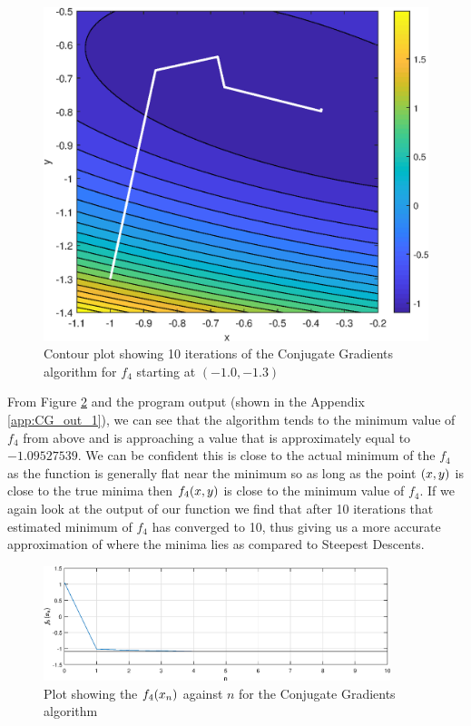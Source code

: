 \documentclass[11pt]{article} %
\let\originalleft\left
\let\originalright\right
\renewcommand{\left}{\mathopen{}\mathclose\bgroup\originalleft}
\renewcommand{\right}{\aftergroup\egroup\originalright}
\begin{document}
\begin{figure}[!h]
	\centering
	\includegraphics{"../Matlab Files/contour5"}
	\caption{Contour plot showing 10 iterations of the Conjugate Gradients algorithm for $f_4$ starting at $(-1.0, -1.3)$}
	\label{fig:CG_10_iter}
\end{figure}
From Figure \ref{fig:CG_limit} and the program output (shown in the Appendix \ref{app:CG_out_1}), we can see that the algorithm tends to the minimum value of $f_4$ from above and is approaching a value that is approximately equal to $-1.09527539$. We can be confident this is close to the actual minimum of the $f_4$ as the function is generally flat near the minimum so as long as the point $\left(x, y\right)$ is close to the true minima then $f_4\left(x, y\right)$ is close to the minimum value of $f_4$. If we again look at the output of our function we find that after 10 iterations that estimated minimum of $f_4$ has converged to 10, thus giving us a more accurate approximation of where the minima lies as compared to Steepest Descents.

\begin{figure}[!h]
	\centering
	\includegraphics[width=0.9\textwidth]{"../Matlab Files/flimit2"}
	\caption{Plot showing the $f_4\left(x_n\right)$ against $n$ for the Conjugate Gradients algorithm}
	\label{fig:CG_limit}
\end{figure}
\end{document}
